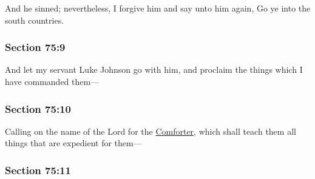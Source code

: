 		And he sinned; nevertheless, I forgive him and say unto him again, Go ye into the south countries.


	\subsubsection{Section 75:9} %
		\label{DC75-9}

		And let my servant Luke Johnson go with him, and proclaim the things which I have commanded them---


	\subsubsection{Section 75:10} %
		\label{DC75-10}

		Calling on the name of the Lord for the \hyperref[COMFORTER]{Comforter}, which shall teach them all things that are expedient for them---


	\subsubsection{Section 75:11} %
		\label{DC75-11}

